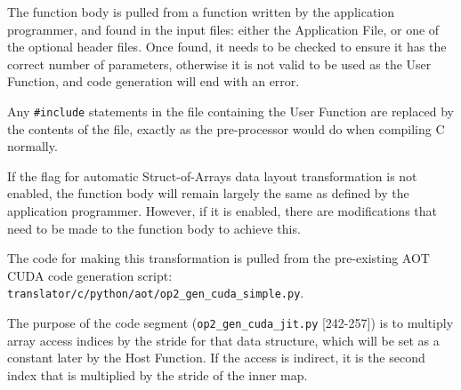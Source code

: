 \noindent The function body is pulled from a function written by the application programmer, and found in the input files: either the Application File, or one of the optional header files. Once found, it needs to be checked to ensure it has the correct number of parameters, otherwise it is not valid to be used as the User Function, and code generation will end with an error.
\par
Any \verb|#include| statements in the file containing the User Function are replaced by the contents of the file, exactly as the pre-processor would do when compiling C normally.
\par
{} If the flag for automatic Struct-of-Arrays data layout transformation is not enabled, the function body will remain largely the same as defined by the application programmer. However, if it is enabled, there are modifications that need to be made to the function body to achieve this.
\par The code for making this transformation is pulled from the pre-existing AOT CUDA code generation script: \\\verb|translator/c/python/aot/op2_gen_cuda_simple.py|.
\par
The purpose of the code segment (\verb|op2_gen_cuda_jit.py| [242-257]) is to multiply array access indices by the stride for that data structure, which will be set as a constant later by the Host Function. If the access is indirect, it is the second index that is multiplied by the stride of the inner map.
